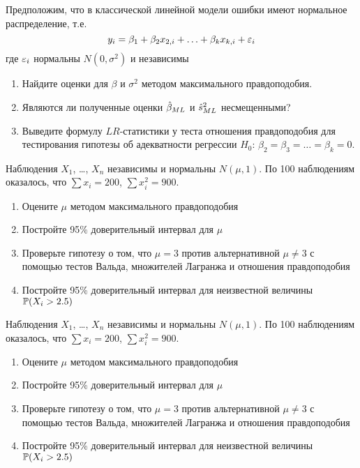 \documentclass[pdftex,11pt,openany]{book}\usepackage[]{graphicx}\usepackage[]{color}
\begin{document}
\begin{problem}
Предположим, что в классической линейной модели ошибки имеют нормальное распределение, т.е.
\[
y_i=\beta_1+\beta_2 x_{2,i}+\ldots+\beta_k x_{k,i}+\e_i
\]
где $\e_i$ нормальны $N(0,\sigma^2)$ и независимы
\begin{enumerate}
\item Найдите оценки для $\beta$ и $\sigma^2$ методом максимального правдоподобия. 
\item Являются ли полученные оценки $\hb_{ML}$ и $\hs^2_{ML}$ несмещенными?
\item Выведите формулу $LR$-статистики у теста отношения правдоподобия для тестирования гипотезы об адекватности регрессии $H_0$: $\beta_2=\beta_3=\ldots=\beta_k=0$.
\end{enumerate}
\end{problem}

\begin{solution}
\end{solution}


\begin{problem}
Наблюдения $X_1$, \ldots, $X_n$ независимы и нормальны $N(\mu,1)$. По 100 наблюдениям оказалось, что $\sum x_i=200$, $\sum x_i^2=900$.
\begin{enumerate}
\item Оцените $\mu$ методом максимального правдоподобия
\item Постройте 95\% доверительный интервал для $\mu$
\item Проверьте гипотезу о том, что $\mu=3$ против альтернативной $\mu\neq 3$ с помощью тестов Вальда, множителей Лагранжа и отношения правдоподобия
\item Постройте 95\% доверительный интервал для неизвестной величины $\P(X_i>2.5)$
\end{enumerate}
Наблюдения $X_1$, \ldots, $X_n$ независимы и нормальны $N(\mu,1)$. По 100 наблюдениям оказалось, что $\sum x_i=200$, $\sum x_i^2=900$.
\begin{enumerate}
\item Оцените $\mu$ методом максимального правдоподобия
\item Постройте 95\% доверительный интервал для $\mu$
\item Проверьте гипотезу о том, что $\mu=3$ против альтернативной $\mu\neq 3$ с помощью тестов Вальда, множителей Лагранжа и отношения правдоподобия
\item Постройте 95\% доверительный интервал для неизвестной величины $\P(X_i>2.5)$
\end{enumerate}
\end{problem}
\end{document}
